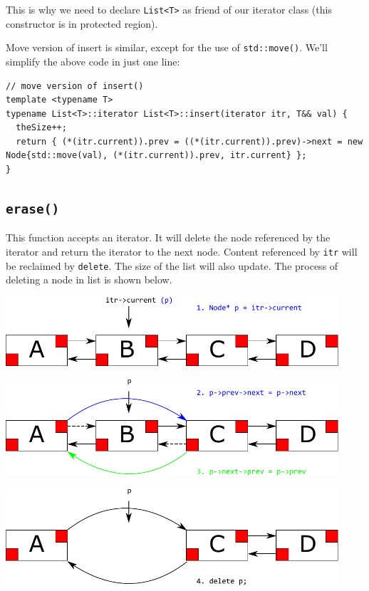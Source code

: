 \documentclass[11pt]{book}
\begin{document}
This is why we need to declare \texttt{List<T>} as friend of our iterator class (this constructor is in protected region).

Move version of insert is similar, except for the use of \texttt{std::move()}. We'll simplify the above code in just one line:
\begin{verbatim}
// move version of insert()
template <typename T>
typename List<T>::iterator List<T>::insert(iterator itr, T&& val) {
  theSize++;
  return { (*(itr.current)).prev = ((*(itr.current)).prev)->next = new Node{std::move(val), (*(itr.current)).prev, itr.current} };
}
\end{verbatim}
\subsection{\texttt{erase()}}
\label{sec:org4cddcc5}
This function accepts an iterator. It will delete the node referenced by the iterator and return the iterator to the next node. Content referenced by \texttt{itr} will be reclaimed by \texttt{delete}. The size of the list will also update. The process of deleting a node in list is shown below.

\begin{center}
\includegraphics[width=350pt]{./img/List-delete-1.pdf}
\end{center}

\begin{center}
\includegraphics[width=350pt]{./img/List-delete-2.pdf}
\end{center}

\begin{center}
\includegraphics[width=350pt]{./img/List-delete-3.pdf}
\end{center}
\end{document}
